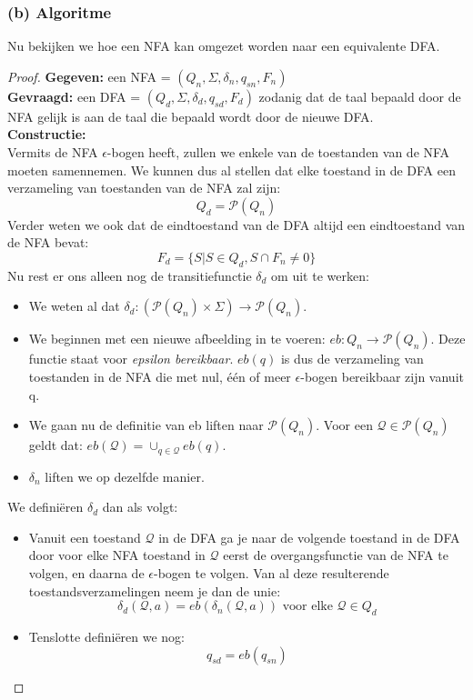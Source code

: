 \subsubsection*{(b) Algoritme}
Nu bekijken we hoe een NFA kan omgezet worden naar een equivalente DFA.\\
\begin{proof}
\textbf{Gegeven:} een NFA = $(Q_n, \Sigma, \delta_n, q_{sn}, F_n)$ \\
\textbf{Gevraagd:} een DFA = $(Q_d, \Sigma, \delta_d, q_{sd}, F_d)$ zodanig dat de taal bepaald door de NFA gelijk is aan de taal die bepaald wordt door de nieuwe DFA.\\
\textbf{Constructie:} \\
Vermits de NFA $\epsilon$-bogen heeft, zullen we enkele van de toestanden van de NFA moeten samennemen. We kunnen dus al stellen dat elke toestand in de DFA een verzameling van toestanden van de NFA zal zijn:
$$ Q_d =  \mathcal{P}(Q_n)$$
Verder weten we ook dat de eindtoestand van de DFA altijd een eindtoestand van de NFA bevat:
$$ F_d = \{S | S \in Q_d, S \cap F_n \neq 0 \}  $$
Nu rest er ons alleen nog de transitiefunctie $\delta_d$ om uit te werken:
\begin{itemize}
\item We weten al dat $\delta_d : (\mathcal{P} (Q_n) \times \Sigma) \rightarrow \mathcal{P}(Q_n)$.
\item We beginnen met een nieuwe afbeelding in te voeren: $eb: Q_n \rightarrow \mathcal{P}(Q_n)$. Deze functie staat voor \emph{epsilon bereikbaar}. $eb(q)$ is dus de verzameling van toestanden in de NFA die met nul, \'e\'en of meer $\epsilon$-bogen bereikbaar zijn vanuit q.
\item We gaan nu de definitie van eb liften naar $\mathcal{P}(Q_n)$. Voor een $\mathcal{Q} \in \mathcal{P}(Q_n)$ geldt dat: $eb(\mathcal{Q}) = \cup_{q \in \mathcal{Q}} eb(q)$.
\item $\delta_n$ liften we op dezelfde manier.
\end{itemize}
We defini\"eren $\delta_d$ dan als volgt:
\begin{itemize}
\item Vanuit een toestand $\mathcal{Q}$ in de DFA ga je naar de volgende toestand in de DFA door voor elke NFA toestand in $\mathcal{Q}$ eerst de overgangsfunctie van de NFA te volgen, en daarna de $\epsilon$-bogen te volgen. Van al deze resulterende toestandsverzamelingen neem je dan de unie:
$$ \delta_d(\mathcal{Q},a) = eb(\delta_n(\mathcal{Q},a)) \text{ voor elke } \mathcal{Q} \in Q_d $$
\item Tenslotte defini\"eren we nog:
$$ q_{sd} = eb(q_{sn}) $$
\end{itemize}
\end{proof}

